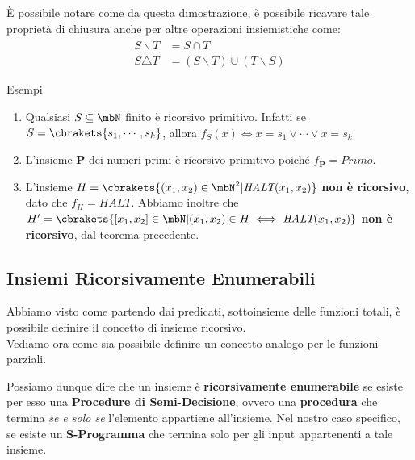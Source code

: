 È possibile notare come da questa dimostrazione, è possibile ricavare tale proprietà di chiusura anche per altre operazioni insiemistiche come:
\begin{equation}
  \begin{split}
    S \smallsetminus T &= S \cap \overline{T}\\
    S \triangle  T &= (S \smallsetminus T) \cup (T \smallsetminus S)
  \end{split}
\end{equation}

\begin{generalbox}[colframe=azure-gradient-3!90!black]{Esempi}
  \begin{enumerate}
    \item Qualsiasi \(S\subseteq \mbN\) finito è ricorsivo primitivo.
    Infatti se \(S=\cbrakets{s_1, \cdots, s_k}\), allora \(f_S(x) \iff x=s_1 \lor \cdots \lor x=s_k\)
    \item L'insieme \(\mathbf{P}\) dei numeri primi è ricorsivo primitivo poiché \(f_{\mathbf{P}}=Primo\).
    \item L'insieme \(H=\cbrakets{(x_1, x_2) \in \mbN^2 \vert \textit{HALT}(x_1, x_2)}\) \textbf{non è ricorsivo}, dato che \(f_H=\textit{HALT}\). Abbiamo inoltre che \(H'=\cbrakets{[x_1,x_2] \in \mbN \vert (x_1, x_2) \in H \iff \textit{HALT}(x_1, x_2)}\) \textbf{non è ricorsivo}, dal teorema precedente.
  \end{enumerate}
\end{generalbox}

\subsection{Insiemi Ricorsivamente Enumerabili}

Abbiamo visto come partendo dai predicati, sottoinsieme delle funzioni totali, è possibile definire il concetto di insieme ricorsivo.\\
Vediamo ora come sia possibile definire un concetto analogo per le funzioni parziali.


Possiamo dunque dire che un insieme è \textbf{ricorsivamente enumerabile} se esiste per esso una \textbf{Procedure di Semi-Decisione}, ovvero una \textbf{procedura} che termina \textit{se e solo se} l'elemento appartiene all'insieme.
Nel nostro caso specifico, se esiste un \textbf{S-Programma} che termina solo per gli input appartenenti a tale insieme.

